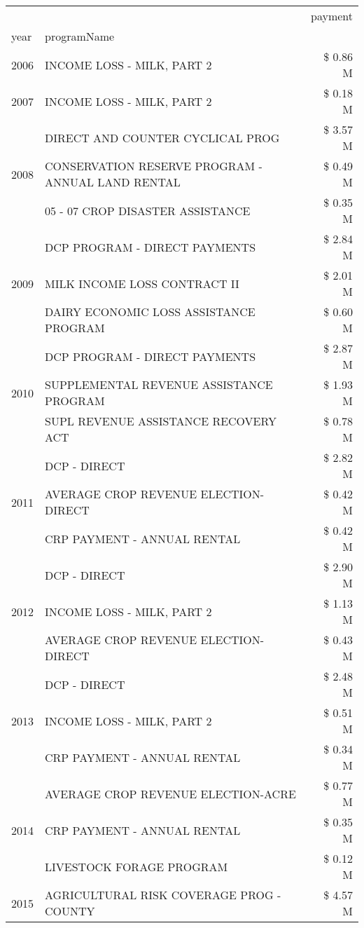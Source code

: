 \begin{tabular}{llr}
\toprule
 &  & payment \\
year & programName &  \\
\midrule
2006 & INCOME LOSS - MILK, PART 2 & \$ 0.86 M \\
\cline{1-3}
2007 & INCOME LOSS - MILK, PART 2 & \$ 0.18 M \\
\cline{1-3}
\multirow[t]{3}{*}{2008} & DIRECT AND COUNTER CYCLICAL PROG & \$ 3.57 M \\
 & CONSERVATION RESERVE PROGRAM - ANNUAL LAND RENTAL & \$ 0.49 M \\
 & 05 - 07 CROP DISASTER ASSISTANCE & \$ 0.35 M \\
\cline{1-3}
\multirow[t]{3}{*}{2009} & DCP PROGRAM - DIRECT PAYMENTS & \$ 2.84 M \\
 & MILK INCOME LOSS CONTRACT II & \$ 2.01 M \\
 & DAIRY ECONOMIC LOSS ASSISTANCE PROGRAM & \$ 0.60 M \\
\cline{1-3}
\multirow[t]{3}{*}{2010} & DCP PROGRAM - DIRECT PAYMENTS & \$ 2.87 M \\
 & SUPPLEMENTAL REVENUE ASSISTANCE PROGRAM & \$ 1.93 M \\
 & SUPL REVENUE ASSISTANCE RECOVERY ACT & \$ 0.78 M \\
\cline{1-3}
\multirow[t]{3}{*}{2011} & DCP - DIRECT & \$ 2.82 M \\
 & AVERAGE CROP REVENUE ELECTION-DIRECT & \$ 0.42 M \\
 & CRP PAYMENT - ANNUAL RENTAL & \$ 0.42 M \\
\cline{1-3}
\multirow[t]{3}{*}{2012} & DCP - DIRECT & \$ 2.90 M \\
 & INCOME LOSS - MILK, PART 2 & \$ 1.13 M \\
 & AVERAGE CROP REVENUE ELECTION-DIRECT & \$ 0.43 M \\
\cline{1-3}
\multirow[t]{3}{*}{2013} & DCP - DIRECT & \$ 2.48 M \\
 & INCOME LOSS - MILK, PART 2 & \$ 0.51 M \\
 & CRP PAYMENT - ANNUAL RENTAL & \$ 0.34 M \\
\cline{1-3}
\multirow[t]{3}{*}{2014} & AVERAGE CROP REVENUE ELECTION-ACRE & \$ 0.77 M \\
 & CRP PAYMENT - ANNUAL RENTAL & \$ 0.35 M \\
 & LIVESTOCK FORAGE PROGRAM & \$ 0.12 M \\
\cline{1-3}
\multirow[t]{3}{*}{2015} & AGRICULTURAL RISK COVERAGE PROG - COUNTY & \$ 4.57 M \\

\end{tabular}
